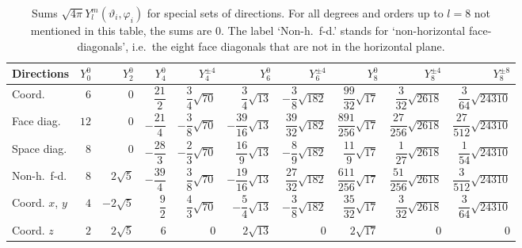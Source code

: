 \documentclass[\mydriver,12pt,twoside,notitlepage,a4paper]{article}
\begin{document}
\begin{table}[htb]
  \renewcommand{\arraystretch}{2.3}
  \centering
  \caption{Sums $\sqrt{4\pi}Y_l^m(\vartheta_i,\varphi_i)$ for special
    sets of directions.
    For all degrees and orders up to $l=8$ not mentioned in this table,
    the sums are $0$.
    The label `Non-h.~f-d.' stands for `non-horizontal face-diagonals',
    i.e.~the eight face diagonals that are not in the horizontal plane.
  }
  \label{Tab-Ylm-sums}
  \footnotesize
  \begin{tabular}{lr@{\qquad}r@{\qquad}rr@{\qquad}rr@{\qquad}rrr}
  \toprule
    Directions   & $Y_0^0$   & $Y_2^0$      & $Y_4^0$          & $Y_4^{\pm4}$             & $Y_6^0$                    & $Y_6^{\pm4}$                & $Y_8^0$                     & $Y_8^{\pm4}$                 & $Y_8^{\pm8}$                  \\
  \midrule
    Coord.       &  $6$      & $0$          &  $\dfrac{21}{2}$ &  $\dfrac{3}{4}\sqrt{70}$ &  $\dfrac{3}{4}\sqrt{13}$   & $-\dfrac{3}{8}\sqrt{182}$   & $\dfrac{99}{32}\sqrt{17}$   & $\dfrac{3}{32}\sqrt{2618}$   & $\dfrac{3}{64}\sqrt{24310}$   \\
    Face diag.   & $12$      & $0$          & $-\dfrac{21}{4}$ & $-\dfrac{3}{8}\sqrt{70}$ & $-\dfrac{39}{16}\sqrt{13}$ &  $\dfrac{39}{32}\sqrt{182}$ & $\dfrac{891}{256}\sqrt{17}$ & $\dfrac{27}{256}\sqrt{2618}$ & $\dfrac{27}{512}\sqrt{24310}$ \\
    Space diag.  &  $8$      & $0$          & $-\dfrac{28}{3}$ & $-\dfrac{2}{3}\sqrt{70}$ & $\dfrac{16}{9}\sqrt{13}$  & $-\dfrac{8}{9}\sqrt{182}$   & $\dfrac{11}{9}\sqrt{17}$    & $\dfrac{1}{27}\sqrt{2618}$   & $\dfrac{1}{54}\sqrt{24310}$   \\
  \midrule
    Non-h.~f-d.  &  $8$      & $2\sqrt{5}$  & $-\dfrac{39}{4}$ &  $\dfrac{3}{8}\sqrt{70}$ & $-\dfrac{19}{16}\sqrt{13}$ & $\dfrac{27}{32}\sqrt{182}$  & $\dfrac{611}{256}\sqrt{17}$ & $\dfrac{51}{256}\sqrt{2618}$ & $\dfrac{3}{512}\sqrt{24310}$  \\
    Coord.
    $x$, $y$     &  $4$      & $-2\sqrt{5}$ & $\dfrac{9}{2}$   &  $\dfrac{4}{3}\sqrt{70}$ & $-\dfrac{5}{4}\sqrt{13}$   & $-\dfrac{3}{8}\sqrt{182}$   & $\dfrac{35}{32}\sqrt{17}$   & $\dfrac{3}{32}\sqrt{2618}$   & $\dfrac{3}{64}\sqrt{24310}$   \\
    Coord. $z$   &  $2$      & $2\sqrt{5}$  & $6$              &  $0$                     & $2\sqrt{13}$               & $0$                         & $2\sqrt{17}$                & $0$                          & $0$                           \\
  \bottomrule
  \end{tabular}
\end{table}
\end{document}
